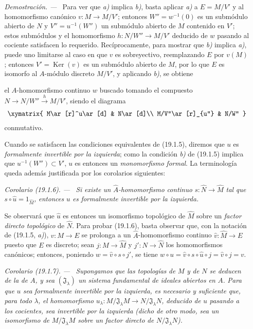 \documentclass[10pt,oneside]{book}
\makeatletter
\newcommand{\setmanualcurrentlabel}[1]{\def\@currentlabel{#1}}
\newcommand{\oldpage}[2][]{%
  \setcounter{footnote}{0}%
  \marginpar{\scriptsize\textbf{#1}~|~#2}\ignorespaces}
\newenvironment{corollary}[1][]{%
  \setmanualcurrentlabel{#1}\par\medskip\noindent\itshape Corolario (#1). ---\ }{\par}
\newenvironment{proof}{%
  \par\medskip\noindent\textit{Demostración. ---\ }}{\par}
\makeatother
\begin{document}
\begin{proof}
Para ver que \emph{a)} implica \emph{b)}, basta aplicar \emph{a)} a $E=M/V'$ y al
homomorfismo canónico $v:M\to M/V'$; entonces $W''=w^{-1}(0)$ es un
submódulo abierto de $N$ y $V''=u^{-1}(W'')$ un submódulo abierto de $M$
contenido en $V'$; estos submódulos y el homomorfismo
$h:N/W''\to M/V'$ deducido de $w$ pasando al cociente satisfacen lo
requerido. Recíprocamente, para mostrar que \emph{b)} implica \emph{a)}, puede uno limitarse al
caso en que $v$ es sobreyectivo, reemplazando $E$ por $v(M)$; entonces
$V'=\operatorname{Ker}(v)$ es un submódulo abierto de $M$, por lo que $E$ es
isomorfo al $A$-módulo discreto $M/V'$, y aplicando \emph{b)}, se obtiene

\oldpage[0\textsubscript{IV-1}]{73}

el $A$-homomorfismo continuo $w$ buscado tomando el compuesto
$N\to N/W''\xrightarrow{h}M/V'$, siendo el diagrama
\[
  \xymatrix{
    M\ar[r]^u\ar[d] & N\ar[d]\\
    M/V''\ar[r]_{u''} & N/W''
  }
\]
conmutativo.
\end{proof}

Cuando se satisfacen las condiciones equivalentes de (19.1.5), diremos que
$u$ es \emph{formalmente invertible por la izquierda}; como la condición \emph{b)} de
(19.1.5) implica que $u^{-1}(W'')\subset V'$, $u$ es entonces un \emph{monomorfismo
formal}. La terminología queda además justificada por los corolarios siguientes:

\begin{corollary}[19.1.6]
\label{0.19.1.6-es}
Si existe un $\widehat A$-homomorfismo continuo
$s:\widehat N\to\widehat M$ tal que
$s\circ\widehat u=1_{\widehat M}$, entonces $u$ es formalmente invertible por la
izquierda.
\end{corollary}

Se observará que $\widehat u$ es entonces un isomorfismo topológico de
$\widehat M$ sobre un \emph{factor directo topológico} de $\widehat N$. Para
probar (19.1.6), basta observar que, con la notación de (19.1.5, \emph{a)}),
$v:M\to E$ se prolonga a un $\widehat A$-homomorfismo continuo
$\widehat v:\widehat M\to E$ puesto que $E$ es discreto; sean
$j:M\to\widehat M$ y $j':N\to\widehat N$ los homomorfismos canónicos;
entonces, poniendo $w=\widehat v\circ s\circ j'$, se tiene
$w\circ u=\widehat v\circ s\circ\widehat u\circ j=\widehat v\circ j=v$.

\begin{corollary}[19.1.7]
\label{0.19.1.7-es}
Supongamos que las topologías de $M$ y de $N$ se deducen de la de $A$,
y sea $(\mathfrak J_\lambda)$ un sistema fundamental de ideales abiertos en
$A$. Para que $u$ sea formalmente invertible por la izquierda, es necesario y suficiente
que, para todo $\lambda$, el homomorfismo
$u_\lambda:M/\mathfrak J_\lambda M\to N/\mathfrak J_\lambda N$, deducido de
$u$ pasando a los cocientes, sea invertible por la izquierda \textup{(dicho de otro modo, sea
un isomorfismo de $M/\mathfrak J_\lambda M$ sobre un factor directo de
$N/\mathfrak J_\lambda N$)}.
\end{corollary}
\end{document}
